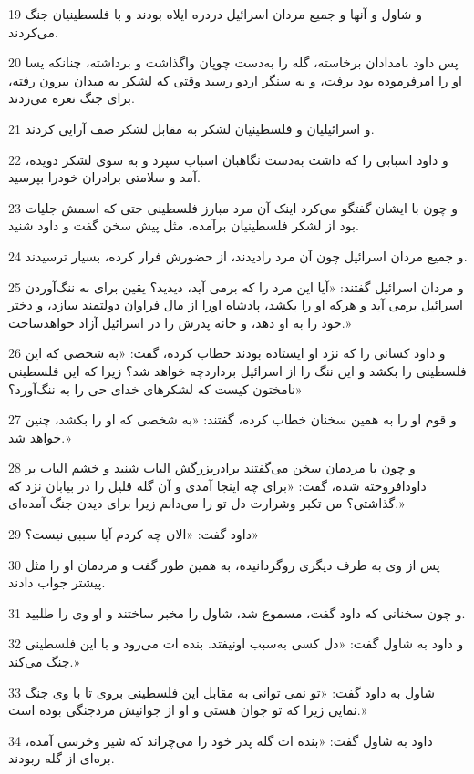 \par 19 و شاول و آنها و جمیع مردان اسرائیل دردره ایلاه بودند و با فلسطینیان جنگ می‌کردند.
\par 20 پس داود بامدادان برخاسته، گله را به‌دست چوپان واگذاشت و برداشته، چنانکه یسا او را امرفرموده بود برفت، و به سنگر اردو رسید وقتی که لشکر به میدان بیرون رفته، برای جنگ نعره می‌زدند.
\par 21 و اسرائیلیان و فلسطینیان لشکر به مقابل لشکر صف آرایی کردند.
\par 22 و داود اسبابی را که داشت به‌دست نگاهبان اسباب سپرد و به سوی لشکر دویده، آمد و سلامتی برادران خودرا بپرسید.
\par 23 و چون با ایشان گفتگو می‌کرد اینک آن مرد مبارز فلسطینی جتی که اسمش جلیات بود از لشکر فلسطینیان برآمده، مثل پیش سخن گفت و داود شنید.
\par 24 و جمیع مردان اسرائیل چون آن مرد رادیدند، از حضورش فرار کرده، بسیار ترسیدند.
\par 25 و مردان اسرائیل گفتند: «آیا این مرد را که برمی آید، دیدید؟ یقین برای به ننگ‌آوردن اسرائیل برمی آید و هر‌که او را بکشد، پادشاه اورا از مال فراوان دولتمند سازد، و دختر خود را به او دهد، و خانه پدرش را در اسرائیل آزاد خواهدساخت.»
\par 26 و داود کسانی را که نزد او ایستاده بودند خطاب کرده، گفت: «به شخصی که این فلسطینی را بکشد و این ننگ را از اسرائیل برداردچه خواهد شد؟ زیرا که این فلسطینی نامختون کیست که لشکرهای خدای حی را به ننگ‌آورد؟»
\par 27 و قوم او را به همین سخنان خطاب کرده، گفتند: «به شخصی که او را بکشد، چنین خواهد شد.»
\par 28 و چون با مردمان سخن می‌گفتند برادربزرگش الیاب شنید و خشم الیاب بر داودافروخته شده، گفت: «برای چه اینجا آمدی و آن گله قلیل را در بیابان نزد که گذاشتی؟ من تکبر وشرارت دل تو را می‌دانم زیرا برای دیدن جنگ آمده‌ای.»
\par 29 داود گفت: «الان چه کردم آیا سببی نیست؟»
\par 30 پس از وی به طرف دیگری روگردانیده، به همین طور گفت و مردمان او را مثل پیشتر جواب دادند.
\par 31 و چون سخنانی که داود گفت، مسموع شد، شاول را مخبر ساختند و او وی را طلبید.
\par 32 و داود به شاول گفت: «دل کسی به‌سبب اونیفتد. بنده ات می‌رود و با این فلسطینی جنگ می‌کند.»
\par 33 شاول به داود گفت: «تو نمی توانی به مقابل این فلسطینی بروی تا با وی جنگ نمایی زیرا که تو جوان هستی و او از جوانیش مردجنگی بوده است.»
\par 34 داود به شاول گفت: «بنده ات گله پدر خود را می‌چراند که شیر وخرسی آمده، بره‌ای از گله ربودند.
